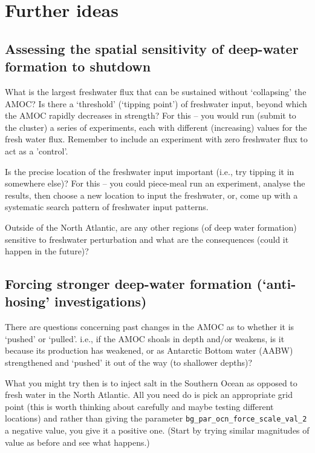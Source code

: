 \newpage

\section{Further ideas}


\subsection{Assessing the spatial sensitivity of deep-water formation to shutdown}

What is the largest freshwater flux that can be sustained without ‘collapsing’ the AMOC? Is there a ‘threshold’ (‘tipping point’) of freshwater input, beyond which the AMOC rapidly decreases in strength? For this -- you would run (submit to the cluster) a series of experiments, each with different (increasing) values for the fresh water flux. Remember to include an experiment with zero freshwater flux to act as a 'control'.

Is the precise location of the freshwater input important (i.e., try tipping it in somewhere else)? For this -- you could piece-meal run an experiment, analyse the results, then choose a new location to input the freshwater, or, come up with a systematic search pattern of freshwater input patterns.  

Outside of the North Atlantic, are any other  regions (of deep water formation) sensitive to freshwater perturbation and what are the consequences (could it happen in the future)?


\subsection{Forcing stronger deep-water formation (‘anti-hosing’ investigations)}

There are questions concerning past changes in the AMOC as to whether it is ‘pushed’ or ‘pulled’. i.e., if the AMOC shoals in depth and/or weakens, is it because its production has weakened, or as Antarctic Bottom water (AABW) strengthened and ‘pushed’ it out of the way (to shallower depths)?

What you might try then is to inject salt in the Southern Ocean as opposed to fresh water in the North Atlantic. All you need do is pick an appropriate grid point (this is worth thinking about carefully and maybe testing different locations) and rather than giving the parameter \texttt{bg\_par\_ocn\_force\_scale\_val\_2} a negative value, you give it a positive one. (Start by trying similar magnitudes of value as before and see what happens.)

